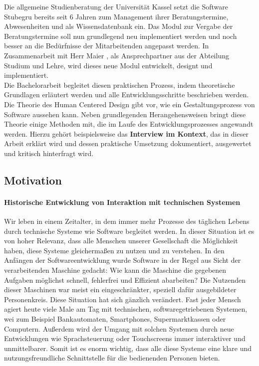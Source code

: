 \documentclass[12pt]{article}
\newcommand{\ipName}{Herr Maier }
\begin{document}
Die allgemeine Studienberatung der Universität Kassel setzt die Software
Stubegru bereits seit 6 Jahren zum Management ihrer Beratungstermine,
Abwesenheiten und als Wissensdatenbank ein. Das Modul zur Vergabe der
Beratungstermine soll nun grundlegend neu implementiert werden und noch besser
an die Bedürfnisse der Mitarbeitenden angepasst werden. In Zusammenarbeit mit
\ipName, als Ansprechpartner aus der Abteilung Studium und Lehre, wird dieses
neue Modul entwickelt, designt und implementiert.\\ Die Bachelorarbeit
begleitet diesen praktischen Prozess, indem theoretische Grundlagen erläutert
werden und alle Entwicklungsschritte beschrieben werden. Die Theorie des Human
Centered Design gibt vor, wie ein Gestaltungsprozess von Software aussehen
kann. Neben grundlegenden Herangehensweisen bringt diese Theorie einige
Methoden mit, die im Laufe des Entwicklungsprozesses angewandt werden. Hierzu
gehört beispielsweise das \textbf{Interview im Kontext}, das in dieser Arbeit
erklärt wird und dessen praktische Umsetzung dokumentiert, ausgewertet und
kritisch hinterfragt wird.

\subsection{Motivation}

\paragraph{Historische Entwicklung von Interaktion mit technischen Systemen}
Wir leben in einem Zeitalter, in dem immer mehr Prozesse des täglichen Lebens
durch technische Systeme wie Software begleitet werden. In dieser Situation ist
es von hoher Relevanz, dass alle Menschen unserer Gesellschaft die Möglichkeit
haben, diese Systeme gleichermaßen zu nutzen und zu verstehen. In den Anfängen
der Softwareentwicklung wurde Software in der Regel aus Sicht der
verarbeitenden Maschine gedacht: Wie kann die Maschine die gegebenen Aufgaben
möglichst schnell, fehlerfrei und Effizient abarbeiten? Die Nutzenden dieser
Maschinen war meist ein eingeschränkter, speziell dafür ausgebildeter
Personenkreis. Diese Situation hat sich gänzlich verändert. Fast jeder Mensch
agiert heute viele Male am Tag mit technischen, softwaregetriebenen Systemen,
wei zum Beispiel Bankautomaten, Smartphones, Supermarktkassen oder Computern.
Außerdem wird der Umgang mit solchen Systemen durch neue Entwicklungen wie
Sprachsteuerung oder Touchscreens immer interaktiver und unmittelbarer. Somit
ist es enorm wichtig, dass alle diese Systeme eine klare und
nutzungsfreundliche Schnittstelle für die bedienenden Personen bieten.
\end{document}
